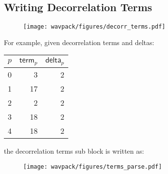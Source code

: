 
\subsection{Writing Decorrelation Terms}
\label{wavpack:write_decorr_terms}

\begin{figure}[h]
  \texttt{[image: wavpack/figures/decorr\_terms.pdf]}
\end{figure}

\clearpage
For example, given decorrelation terms and deltas:
\begin{table}[h]
\begin{tabular}{rrr}
$p$ & $\textsf{term}_p$ & $\textsf{delta}_p$ \\
\hline
0 & 3 & 2 \\
1 & 17 & 2 \\
2 & 2 & 2 \\
3 & 18 & 2 \\
4 & 18 & 2 \\
\end{tabular}
\end{table}
\par
\noindent
the decorrelation terms sub block is written as:
\begin{figure}[h]
\texttt{[image: wavpack/figures/terms\_parse.pdf]}
\end{figure}
